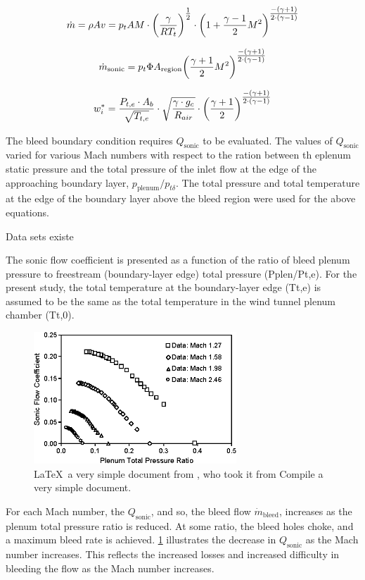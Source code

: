 \documentclass{article}
\newcommand{\sfrac}[2]{\textstyle\frac{#1}{#2}}
\newcommand{\mdot}{\dot{m}}
\newcommand{\trm}[1]{\textrm{#1}}
\begin{document}
$$ \mdot = \rho A v = p_t A M \cdot \qty(\frac{\gamma}{RT_t})^{\sfrac{1}{2}} \cdot \qty(1 + \frac{\gamma-1}{2}M^2)^{\sfrac{-\qty(\gamma+1)}{2\cdot\qty(\gamma-1)}} $$

$$ \mdot_\trm{sonic} = p_t \Phi A_\trm{region} \qty(\frac{\gamma+1}{2}M^2)^{\sfrac{-\qty(\gamma+1)}{2\cdot\qty(\gamma-1)}} $$

$$ w_i^* = \frac{P_{t,e}\cdot A_b }{\sqrt{T_{t,e}}} \cdot \sqrt{\frac{\gamma\cdot g_c}{R_{air}}} \cdot \qty(\frac{\gamma+1}{2})^{\sfrac{-\qty(\gamma+1)}{2\cdot\qty(\gamma-1)}} $$

The bleed boundary condition requires $Q_\trm{sonic}$ to be evaluated. The values of $Q_\trm{sonic}$ varied for various Mach numbers with respect to the ration between th eplenum static pressure and the total pressure of the inlet flow at the edge of the approaching boundary layer, $p_\trm{plenum}/p_{t\delta}$. The total pressure and total temperature at the edge of the boundary layer above the bleed region were used for the above equations.

Data sets existe

The sonic flow coefficient is presented as a function of the ratio of bleed plenum pressure to freestream (boundary-layer edge) total pressure (Pplen/Pt,e). For the present study, the total temperature at the boundary-layer edge (Tt,e) is assumed to be the same as the total temperature in the wind tunnel plenum chamber (Tt,0).

\begin{figure}[htbp]
 \begin{center}
    \includegraphics[width=3in]{drawing-1.eps}
     \caption{\LaTeX\ a very simple document from \cite{Slater2012}, who took it from \cite{Willis1995} Compile a very simple document.}
     \label{fig:MyFirstLaTeX}
 \end{center}
\end{figure}

For each Mach number, the $Q_\trm{sonic}$, and so, the bleed flow $\mdot_\trm{bleed}$, increases as the plenum total pressure ratio is reduced. At some ratio, the bleed holes choke, and a maximum bleed rate is achieved. \cref{fig:MyFirstLaTeX} illustrates the decrease in $Q_\trm{sonic}$ as the Mach number increases. This reflects the increased losses and increased difficulty in bleeding the flow as the Mach number increases.
\end{document}

